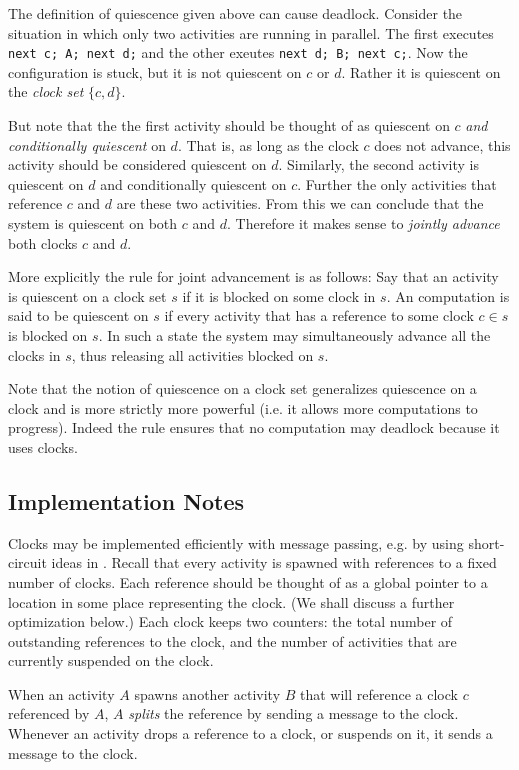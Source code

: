 The definition of quiescence given above can cause deadlock. Consider
the situation in which only two activities are running in
parallel. The first executes {\tt next c; A; next d;} and the other
exeutes {\tt next d; B; next c;}. Now the configuration is stuck, but
it is not quiescent on $c$ or $d$. Rather it is quiescent on the
{\em clock set} $\{c, d\}$.

But note that the the first activity should be thought of as quiescent
on $c$ {\em and} {\em conditionally quiescent} on $d$. That is, as
long as the clock $c$ does not advance, this activity should be
considered quiescent on $d$. Similarly, the second activity is
quiescent on $d$ and conditionally quiescent on $c$. Further the only
activities that reference $c$ and $d$ are these two activities. From
this we can conclude that the system is quiescent on both $c$ and
$d$. Therefore it makes sense to {\em jointly advance} both clocks $c$
and $d$. 

More explicitly the rule for joint advancement is as follows: Say that
an activity is quiescent on a clock set $s$ if it is blocked on some
clock in $s$. An  computation is said to be quiescent on $s$ if
every activity that has a reference to some clock $c \in s$ is blocked
on $s$.  In such a state the system may simultaneously advance all the
clocks in $s$, thus releasing all activities blocked on $s$.

Note that the notion of quiescence on a clock set generalizes
quiescence on a clock and is more strictly more powerful (i.e.{} it
allows more computations to progress). Indeed the rule ensures that no
computation may deadlock because it uses clocks.

\subsection{Implementation Notes}
Clocks may be implemented efficiently with message passing, e.g.{} by
using short-circuit ideas in \cite{SaraswatPODC87}.  Recall that every
activity is spawned with references to a fixed number of clocks. Each
reference should be thought of as a global pointer to a location in
some place representing the clock. (We shall discuss a further
optimization below.) Each clock keeps two counters: the total number
of outstanding references to the clock, and the number of activities
that are currently suspended on the clock.

When an activity $A$ spawns another activity $B$ that will reference a
clock $c$ referenced by $A$, $A$ {\em splits} the reference by sending
a message to the clock. Whenever an activity drops a reference to a
clock, or suspends on it, it sends a message to the clock. 

